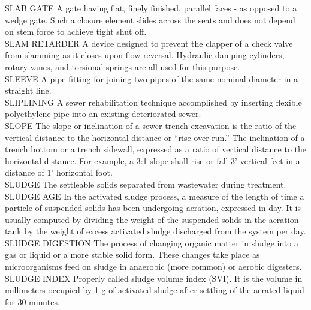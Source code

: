 \documentclass{article}
\begin{document}
SLAB GATE
A gate having flat, finely finished, parallel faces - as opposed to a wedge gate. Such a closure element slides across the seats and does not depend on stem force to achieve tight shut off.
\vspace{0.3cm}\\
SLAM RETARDER
A device designed to prevent the clapper of a check valve from slamming as it closes upon flow reversal. Hydraulic damping cylinders, rotary vanes, and torsional springs are all used for this purpose.
\vspace{0.3cm}\\
SLEEVE
A pipe fitting for joining two pipes of the same nominal diameter in a straight line. 
\vspace{0.3cm}\\
SLIPLINING
A sewer rehabilitation technique accomplished by inserting flexible polyethylene pipe into an existing deteriorated sewer. 
\vspace{0.3cm}\\
SLOPE
The slope or inclination of a sewer trench excavation is the ratio of the vertical distance to the horizontal distance or “rise over run.” The inclination of a trench bottom or a trench sidewall, expressed as a ratio of vertical distance to the horizontal distance. For example, a 3:1 slope shall rise or fall 3’ vertical feet in a distance of 1’ horizontal foot. 
\vspace{0.3cm}\\
SLUDGE
The settleable solids separated from wastewater during treatment.
\vspace{0.3cm}\\
SLUDGE AGE
In the activated sludge process, a measure of the length of time a particle of suspended solids has been undergoing aeration, expressed in day. It is usually computed by dividing the weight of the suspended solids in the aeration tank by the weight of excess activated sludge discharged from the system per day.
\vspace{0.3cm}\\
SLUDGE DIGESTION
The process of changing organic matter in sludge into a gas or liquid or a more stable solid form. These changes take place as microorganisms feed on sludge in anaerobic (more common) or aerobic digesters.
\vspace{0.3cm}\\
SLUDGE INDEX
Properly called sludge volume index (SVI). It is the volume in millimeters occupied by 1 g of activated sludge after settling of the aerated liquid for 30 minutes.
\vspace{0.3cm}\\
\end{document}

